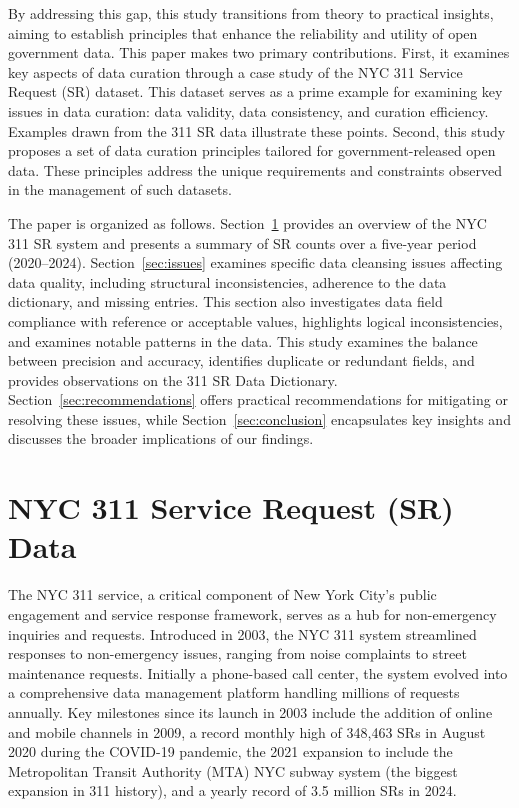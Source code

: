 \documentclass[linenumber]{jdsart}
\begin{document}
By addressing this gap, this study transitions from theory to
practical insights, aiming to establish principles that enhance 
the reliability and utility of open government data.
This paper makes two primary contributions. First, it examines 
key aspects of data curation through a case study
of the NYC 311 Service Request (SR) dataset. This dataset 
serves as a prime example for examining key issues 
in data curation: data validity, data consistency, and curation 
efficiency. Examples drawn from the 311 SR data illustrate 
these points. Second, this study proposes a 
set of data curation principles tailored for government-released 
open data. These principles address the unique requirements and 
constraints observed in the management of such datasets.


The paper is organized as follows. Section~\ref{sec:data} provides 
an overview of the NYC 311 SR system and presents 
a summary of SR counts over a five-year period (2020--2024). 
Section~\ref{sec:issues} examines specific data cleansing issues
affecting data quality, including structural inconsistencies,
adherence to the data dictionary, and missing entries. This section 
also investigates data field compliance with reference or acceptable values, 
highlights logical inconsistencies, and examines notable patterns in 
the data. This study examines the balance between precision and 
accuracy, identifies duplicate or redundant fields, and provides 
observations on the 311 SR Data Dictionary. Section~\ref{sec:recommendations} 
offers practical recommendations for mitigating or resolving these issues, 
while Section~\ref{sec:conclusion} encapsulates key insights and 
discusses the broader implications of our findings.


\section{NYC 311 Service Request (SR) Data} 
\label{sec:data}

The NYC 311 service, a critical component of New York City's public
engagement and service response framework, serves as a hub
for non-emergency inquiries and requests. Introduced in 2003, the NYC
311 system streamlined responses to
non-emergency issues, ranging from noise complaints to street
maintenance requests. Initially a phone-based call center, the system
evolved into a comprehensive data management platform handling
millions of requests annually. Key milestones since its launch in 2003
include the addition of online and mobile channels in 2009, a
record monthly high of 348,463 SRs in 
August 2020 during the COVID-19 
pandemic, the 2021 expansion to include the 
Metropolitan Transit Authority (MTA) NYC subway 
system (the biggest expansion in 311 history), 
and a yearly record of 3.5 million SRs in 2024. 
\end{document}
